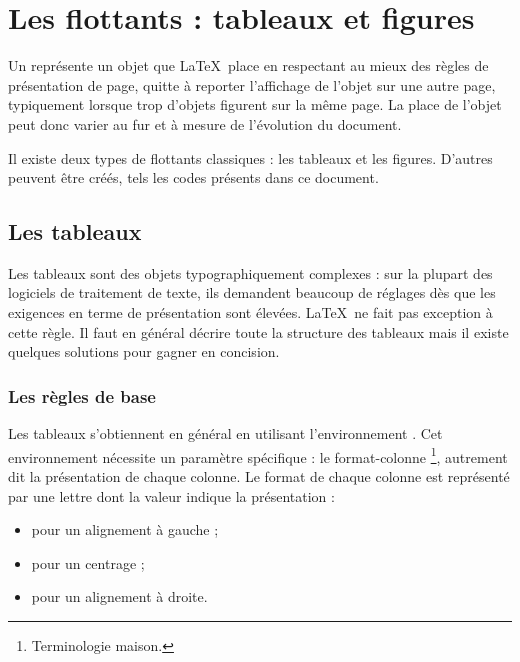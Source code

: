 
\chapter{Les flottants : tableaux et figures}

Un  représente un objet que \LaTeX\ place en respectant au mieux des règles de présentation de page, quitte à reporter l'affichage de l'objet sur une autre page, typiquement lorsque trop d'objets figurent sur la même page. La place de l'objet peut donc varier au fur et à mesure de l'évolution du document.

Il existe deux types de flottants classiques : les tableaux et les figures. D'autres peuvent être créés, tels les \og codes \fg présents dans ce document.


\section{Les tableaux} \label{tableau} 

Les tableaux sont des objets typographiquement complexes : sur la plupart des logiciels de traitement de texte, ils demandent beaucoup de réglages dès que les exigences en terme de présentation sont élevées. \LaTeX\ ne fait pas exception à cette règle. Il faut en général décrire toute la structure des tableaux mais il existe quelques solutions pour gagner en concision.


\subsection{Les règles de base}

Les tableaux s'obtiennent en général en utilisant l'environnement . Cet environnement nécessite un paramètre spécifique : le \og format-colonne \fg\footnote{Terminologie maison.}, autrement dit la présentation de chaque colonne. Le format de chaque colonne est représenté par une lettre dont la valeur indique la présentation :
\begin{itemize}
\item {} pour un alignement à gauche ; 
\item {} pour un centrage ;
\item {} pour un alignement à droite. 
\end{itemize}

